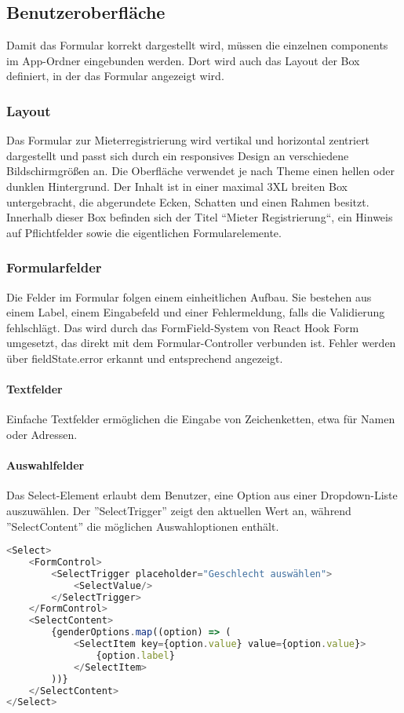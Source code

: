 \subsection{Benutzeroberfläche}
Damit das Formular korrekt dargestellt wird, müssen die einzelnen \gls{components} im App-Ordner eingebunden werden. Dort wird auch das Layout der Box definiert, in der das Formular angezeigt wird.

\subsubsection{Layout}
Das Formular zur Mieterregistrierung wird vertikal und horizontal zentriert dargestellt und passt sich durch ein responsives Design an verschiedene Bildschirmgrößen an. Die Oberfläche verwendet je nach Theme einen hellen oder dunklen Hintergrund. Der Inhalt ist in einer maximal 3XL breiten Box untergebracht, die abgerundete Ecken, Schatten und einen Rahmen besitzt. Innerhalb dieser Box befinden sich der Titel ``Mieter Registrierung``, ein Hinweis auf Pflichtfelder sowie die eigentlichen Formularelemente. \cite{prompt26_pollak}

\subsubsection{Formularfelder}
Die Felder im Formular folgen einem einheitlichen Aufbau. Sie bestehen aus einem Label, einem Eingabefeld und einer Fehlermeldung, falls die Validierung fehlschlägt. Das wird durch das FormField-System von React Hook Form umgesetzt, das direkt mit dem Formular-Controller verbunden ist. Fehler werden über fieldState.error erkannt und entsprechend angezeigt.

\paragraph{Textfelder}
Einfache Textfelder ermöglichen die Eingabe von Zeichenketten, etwa für Namen oder Adressen.

\newpage

\paragraph{Auswahlfelder}
Das Select-Element erlaubt dem Benutzer, eine Option aus einer Dropdown-Liste auszuwählen. Der ''SelectTrigger'' zeigt den aktuellen Wert an, während ''SelectContent'' die möglichen Auswahloptionen enthält.

\begin{lstlisting}[language=JavaScript]
<Select>
    <FormControl>
        <SelectTrigger placeholder="Geschlecht auswählen">
            <SelectValue/>
        </SelectTrigger>
    </FormControl>
    <SelectContent>
        {genderOptions.map((option) => (
            <SelectItem key={option.value} value={option.value}>
                {option.label}
            </SelectItem>
        ))}
    </SelectContent>
</Select>
\end{lstlisting}

